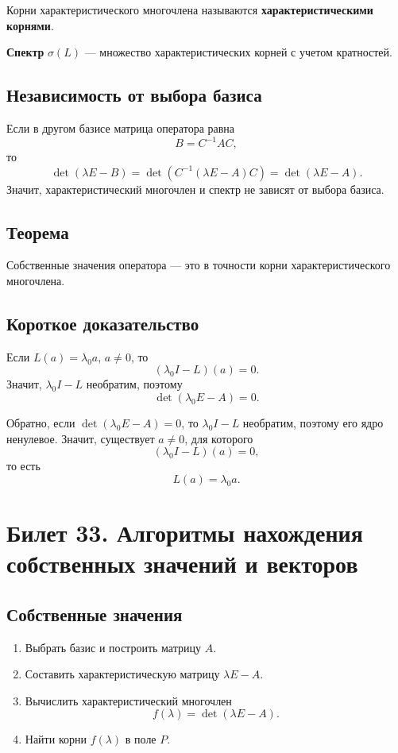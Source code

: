 \documentclass[12pt,a4paper]{article}
\begin{document}
Корни характеристического многочлена называются \textbf{характеристическими корнями}.

\textbf{Спектр} $\sigma(L)$ --- множество характеристических корней с учетом кратностей.

\subsection*{Независимость от выбора базиса}

Если в другом базисе матрица оператора равна
\[
    B=C^{-1}AC,
\]
то
\[
    \det(\lambda E-B)
    =\det(C^{-1}(\lambda E-A)C)
    =\det(\lambda E-A).
\]
Значит, характеристический многочлен и спектр не зависят от выбора базиса.

\subsection*{Теорема}

Собственные значения оператора --- это в точности корни характеристического многочлена.

\subsection*{Короткое доказательство}

Если $L(a)=\lambda_0a$, $a\ne0$, то
\[
    (\lambda_0I-L)(a)=0.
\]
Значит, $\lambda_0I-L$ необратим, поэтому
\[
    \det(\lambda_0E-A)=0.
\]

Обратно, если $\det(\lambda_0E-A)=0$, то $\lambda_0I-L$ необратим, поэтому его ядро ненулевое. Значит, существует $a\ne0$, для которого
\[
    (\lambda_0I-L)(a)=0,
\]
то есть
\[
    L(a)=\lambda_0a.
\]

\section{Билет 33. Алгоритмы нахождения собственных значений и векторов}

\subsection*{Собственные значения}

\begin{enumerate}
    \item Выбрать базис и построить матрицу $A$.
    \item Составить характеристическую матрицу $\lambda E-A$.
    \item Вычислить характеристический многочлен
    \[
        f(\lambda)=\det(\lambda E-A).
    \]
    \item Найти корни $f(\lambda)$ в поле $P$.
\end{enumerate}
\end{document}
